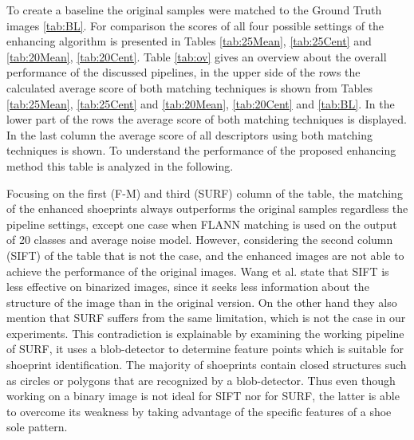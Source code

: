 \documentclass[draft,final]{vutinfth} %
\begin{document}
To create a baseline the original samples were matched to the Ground Truth images \ref{tab:BL}.
For comparison the scores of all four possible settings of the enhancing algorithm is presented in Tables \ref{tab:25Mean}, \ref{tab:25Cent} and \ref{tab:20Mean}, \ref{tab:20Cent}.
Table \ref{tab:ov} gives an overview about the overall performance of the discussed pipelines, in the upper side of the rows the calculated average score of both matching techniques is shown from Tables \ref{tab:25Mean}, \ref{tab:25Cent} and \ref{tab:20Mean}, \ref{tab:20Cent} and \ref{tab:BL}.
In the lower part of the rows the average score of both matching techniques is displayed.
In the last column the average score of all descriptors using both matching techniques is shown.
To understand the performance of the proposed enhancing method this table is analyzed in the following.
\par
Focusing on the first (F-M) and third (SURF) column of the table, the matching of the enhanced shoeprints always outperforms the original samples regardless the pipeline settings, except one case when FLANN matching is used on the output of 20 classes and average noise model.
However, considering the second column (SIFT) of the table that is not the case, and the enhanced images are not able to achieve the performance of the original images.
Wang et al. \cite{wang2017manifold} state that SIFT is less effective on binarized images, since it seeks less information about the structure of the image than in the original version.
On the other hand they also mention that SURF suffers from the same limitation, which is not the case in our experiments.
This contradiction is explainable by examining the working pipeline of SURF, it uses a blob-detector to determine feature points which is suitable for shoeprint identification.
The majority of shoeprints contain closed structures such as circles or polygons that are recognized by a blob-detector.
Thus even though working on a binary image is not ideal for SIFT nor for SURF, the latter is able to overcome its weakness by taking advantage of the specific features of a shoe sole pattern.
\end{document}
